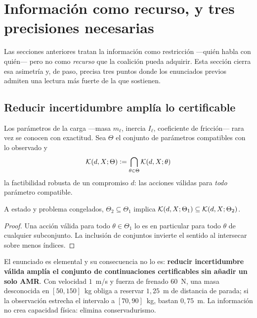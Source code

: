 \section{Información como recurso, y tres precisiones necesarias}
\label{sec:informacion2}

Las secciones anteriores tratan la información como restricción —quién habla con
quién— pero no como \emph{recurso} que la coalición pueda adquirir. Esta sección
cierra esa asimetría y, de paso, precisa tres puntos donde los enunciados
previos admiten una lectura más fuerte de la que sostienen.

\subsection{Reducir incertidumbre amplía lo certificable}

Los parámetros de la carga —masa $m_\ell$, inercia $I_\ell$, coeficiente de
fricción— rara vez se conocen con exactitud. Sea $\Theta$ el conjunto de
parámetros compatibles con lo observado y
\begin{equation}
  \mathcal{K}(d,X;\Theta)\vcentcolon=\bigcap_{\theta\in\Theta}\mathcal{K}(d,X;\theta)
  \label{eq:factibilidad-robusta}
\end{equation}
la factibilidad robusta de un compromiso $d$: las acciones válidas para
\emph{todo} parámetro compatible.

\begin{proposicion}
\label{pr:monotonia-info}
A estado y problema congelados, $\Theta_2\subseteq\Theta_1$ implica
$\mathcal{K}(d,X;\Theta_1)\subseteq\mathcal{K}(d,X;\Theta_2)$.
\end{proposicion}

\begin{proof}
Una acción válida para todo $\theta\in\Theta_1$ lo es en particular para todo
$\theta$ de cualquier subconjunto. La inclusión de conjuntos invierte el sentido
al intersecar sobre menos índices.
\end{proof}

El enunciado es elemental y su consecuencia no lo es: \textbf{reducir incertidumbre válida amplía el conjunto de
continuaciones certificables sin añadir un solo AMR}. Con velocidad $1$~m/s y fuerza de frenado $60$~N, una masa desconocida en
$[50,150]$~kg obliga a reservar $1{,}25$~m de distancia de parada; si la
observación estrecha el intervalo a $[70,90]$~kg, bastan $0{,}75$~m. La
información no crea capacidad física: elimina conservadurismo.

